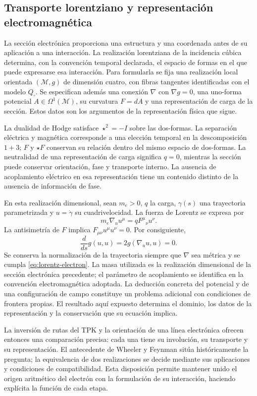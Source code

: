 \subsection{Transporte lorentziano y representación electromagnética}

La sección electrónica proporciona una estructura y una coordenada
antes de su aplicación a una interacción. La realización lorentziana
de la incidencia cúbica determina, con la convención temporal declarada,
el espacio de formas en el que puede expresarse esa interacción.
Para formularla se fija una realización local orientada \((\mathcal M,g)\)
de dimensión cuatro, con fibras tangentes identificadas con el modelo
\(Q_\square\). Se especifican además una conexión \(\nabla\) con
\(\nabla g=0\), una uno-forma potencial \(A\in\Omega^1(\mathcal M)\),
su curvatura \(F=dA\) y una representación de carga de la sección.
Estos datos son los argumentos de la representación física que sigue.

La dualidad de Hodge satisface \(\star^2=-I\) sobre las dos-formas.
La separación eléctrica y magnética corresponde a una elección temporal
en la descomposición \(1+3\); \(F\) y \(\star F\) conservan su
relación dentro del mismo espacio de dos-formas. La neutralidad de una
representación de carga significa \(q=0\), mientras la sección puede
conservar orientación, fase y transporte interno. La ausencia de
acoplamiento eléctrico en esa representación tiene un contenido distinto
de la ausencia de información de fase.

En esta realización dimensional, sean \(m_e>0\), \(q\) la carga,
\(\gamma(s)\) una trayectoria parametrizada y \(u=\dot\gamma\)
su cuadrivelocidad. La fuerza de Lorentz se expresa por
\begin{equation}
 m_e\nabla_u u^\mu=qF^\mu{}_{\nu}u^\nu.
 \label{eq:lorentz-electron}
\end{equation}
La antisimetría de \(F\) implica
\(F_{\mu\nu}u^\mu u^\nu=0\). Por consiguiente,
\[
 \frac{d}{ds}g(u,u)=2g(\nabla_u u,u)=0.
\]
Se conserva la normalización de la trayectoria siempre que \(\nabla\)
sea métrica y se cumpla \eqref{eq:lorentz-electron}. La masa utilizada
es la realización dimensional de la sección electrónica precedente;
el parámetro de acoplamiento se identifica en la convención electromagnética
adoptada. La deducción concreta del potencial y de una configuración
de campo constituye un problema adicional con condiciones de frontera
propias. El resultado aquí expuesto determina el dominio, los datos
de la representación y la conservación que su ecuación implica.

La inversión de rutas del TPK y la orientación de una línea electrónica
ofrecen entonces una comparación precisa: cada una tiene su involución,
su transporte y su representación. El antecedente de Wheeler y Feynman
sitúa históricamente la pregunta; la equivalencia de dos realizaciones
se decide mediante sus aplicaciones y condiciones de compatibilidad.
Esta disposición permite mantener unido el origen aritmético del electrón
con la formulación de su interacción, haciendo explícita la función
de cada etapa.

